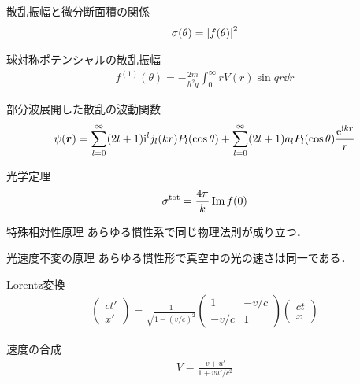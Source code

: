 \documentclass{report}
\begin{document}
  \begin{itembox}[l]{散乱振幅と微分断面積の関係}
    \begin{align*}
      \sigma(\theta) = \abs{f(\theta)}^2
    \end{align*}
  \end{itembox}
  \begin{itembox}[l]{球対称ポテンシャルの散乱振幅}
    \begin{align*}
      f^{(1)}(\theta) =  -\frac{2m}{\hbar^2 q} \int_{0}^{\infty} rV(r)\sin qr \dd{r}
    \end{align*}
  \end{itembox}
  \begin{itembox}[l]{部分波展開した散乱の波動関数}
    \begin{align*}
      \psi(\bm{r}) = \sum_{l=0}^{\infty} (2l+1)\mathrm{i}^l j_l(kr)P_l(\cos\theta) + \sum_{l=0}^{\infty} (2l+1)a_l P_l(\cos\theta) \frac{\mathrm{e}^{\mathrm{i} kr}}{r}
    \end{align*}
  \end{itembox}
  \begin{itembox}[l]{光学定理}
    \begin{align*}
      \sigma^{\mathrm{tot}} = \frac{4\pi}{k} \Im f(0)
    \end{align*}
  \end{itembox}
  \begin{itembox}[l]{特殊相対性原理}
    あらゆる慣性系で同じ物理法則が成り立つ．
  \end{itembox}
  \begin{itembox}[l]{光速度不変の原理}
    あらゆる慣性形で真空中の光の速さは同一である．
  \end{itembox}
  \begin{itembox}[l]{Lorentz変換}
    \begin{align*}
      \begin{pmatrix}
        ct' \\ x'
      \end{pmatrix}
      =
      \frac{1}{\sqrt{1 - (v/c)^2}}
      \begin{pmatrix}
        1 & -v/c\\
        -v/c & 1
      \end{pmatrix}
      \begin{pmatrix}
        ct\\x
      \end{pmatrix}
    \end{align*}
  \end{itembox}
  \begin{itembox}[l]{速度の合成}
    \begin{align*}
      V = \frac{v + u'}{1 + vu' / c^2}
    \end{align*}
  \end{itembox}
\end{document}
